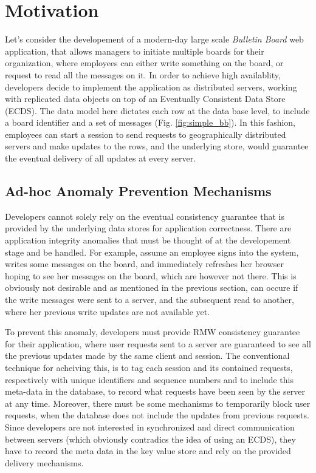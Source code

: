 \newpage
\section{Motivation}
%
%

Let's consider the developement of a modern-day large scale \emph{Bulletin
Board} web application, that allows managers to initiate multiple boards for their
organization, where employees can either write something on the
board, or request to read all the messages on it.
In order to achieve high availablity, developers decide to implement the
application as distributed servers, working
with replicated data objects on top of an 
Eventually Consistent Data Store ({ECDS}). The data model here dictates
each row at the data base level, to include a board identifier
and a set of messages 
(Fig. \ref{fig:simple_bb}).
In this fashion, employees can start a session to send requests to geographically distributed
servers and make updates to the rows, and the underlying store,
would guarantee the eventual delivery of all updates at every server.

%
%
\subsection{Ad-hoc Anomaly Prevention Mechanisms}

Developers cannot solely rely on the eventual consistency guarantee that
is provided by the underlying data stores for application correctness. There are application integrity anomalies
that must be thought of at the developement stage and be handled. For
example, assume an employee signs into the system, writes some
messages on the board, and immediately refreshes her browser hoping to see
her messages on the board, which are however not there. This is obviously
not desirable and as mentioned in
the previous section,  can occure if
the write messages were sent to a server, and the subsequent read to
another, where her previous write updates are  not available yet. 

%
%

To prevent this anomaly, developers must provide RMW consistency
guarantee for their application, where user requests sent to a server are guaranteed to see
all the previous updates made by the same client and session. The
conventional technique for acheiving this,
is to tag each session and its contained requests, respectively with unique identifiers and
sequence numbers and to include this meta-data in the database, to
record what requests have been seen by the server at any time. 
Moreover, there must be some mechanisms to temporarily block user requests, when the database
does not include the updates from previous requests.
Since developers are not interested in synchronized and direct
communication between servers (which obviously contradics the idea of using
an ECDS), they have to record the meta data in the key value store and rely on
the provided delivery mechanisms. 
%
%


